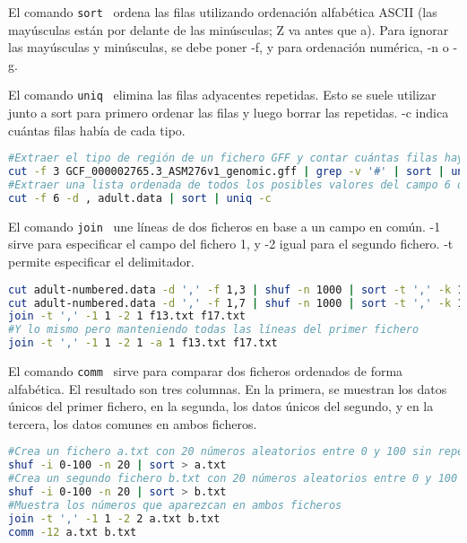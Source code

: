  El comando \texttt{sort}  \ ordena las filas utilizando ordenación alfabética ASCII (las mayúsculas están por delante de las minúsculas; Z va antes que a). Para ignorar las mayúsculas y minúsculas, se debe poner -f, y para ordenación numérica, -n o -g. 
 
 El comando \texttt{uniq}  \ elimina las filas adyacentes repetidas. Esto se suele utilizar junto a sort para primero ordenar las filas y luego borrar las repetidas. -c indica cuántas filas había de cada tipo. 
\begin{lstlisting}[language=bash]
#Extraer el tipo de región de un fichero GFF y contar cuántas filas hay de cada tipo
cut -f 3 GCF_000002765.3_ASM276v1_genomic.gff | grep -v '#' | sort | uniq -c
#Extraer una lista ordenada de todos los posibles valores del campo 6 de adult.data
cut -f 6 -d , adult.data | sort | uniq -c
\end{lstlisting}

El comando \texttt{join}  \ une líneas de dos ficheros en base a un campo en común. -1 sirve para especificar el campo del fichero 1, y -2 igual para el segundo fichero. -t permite especificar el delimitador.
\begin{lstlisting}[language=bash]
cut adult-numbered.data -d ',' -f 1,3 | shuf -n 1000 | sort -t ',' -k 1,1 > f13.txt
cut adult-numbered.data -d ',' -f 1,7 | shuf -n 1000 | sort -t ',' -k 1,1 > f17.txt
join -t ',' -1 1 -2 1 f13.txt f17.txt
#Y lo mismo pero manteniendo todas las líneas del primer fichero
join -t ',' -1 1 -2 1 -a 1 f13.txt f17.txt
\end{lstlisting}

El comando \texttt{comm}  \ sirve para comparar dos ficheros ordenados de forma alfabética. El resultado son tres columnas. En la primera, se muestran los datos únicos del primer fichero, en la segunda, los datos únicos del segundo, y en la tercera, los datos comunes en ambos ficheros. 

\begin{lstlisting}[language=bash]
#Crea un fichero a.txt con 20 números aleatorios entre 0 y 100 sin repetir; cada número debe estar en una línea distinta
shuf -i 0-100 -n 20 | sort > a.txt
#Crea un segundo fichero b.txt con 20 números aleatorios entre 0 y 100 sin repetir; cada número debe estar en una línea distinta
shuf -i 0-100 -n 20 | sort > b.txt
#Muestra los números que aparezcan en ambos ficheros
join -t ',' -1 1 -2 2 a.txt b.txt
comm -12 a.txt b.txt
\end{lstlisting}


